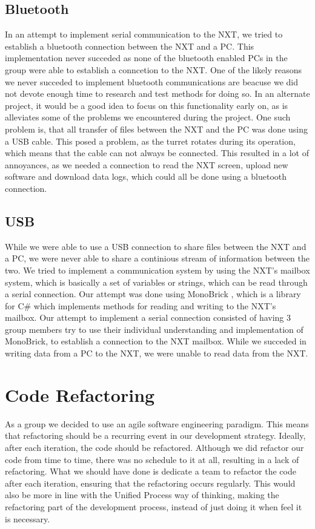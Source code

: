 \subsection{Bluetooth}
In an attempt to implement serial communication to the NXT, we tried to
establish a bluetooth connection between the NXT and a PC. This implementation
never succeded as none of the bluetooth enabled PCs in the group were able to
establish a conncetion to the NXT.\nl
One of the likely reasons we never succeded to implement bluetooth
communications are beacuse we did not devote enough time to research and test
methods for doing so. In an alternate project, it would be a good idea to focus
on this functionality early on, as is alleviates some of the problems we
encountered during the project. One such problem is, that all transfer of files
between the NXT and the PC was done using a USB cable. This posed a problem, as
the turret rotates during its operation, which means that the cable can not
always be connected. This resulted in a lot of annoyances, as we needed a
connection to read the NXT screen, upload new software and download data logs,
which could all be done using a bluetooth connection.

\subsection{USB}
While we were able to use a USB connection to share files between the NXT and a
PC, we were never able to share a continious stream of information between the
two. We tried to implement a communication system by using the NXT's mailbox
system, which is basically a set of variables or strings, which can be read
through a serial connection. Our attempt was done using MonoBrick
\cite{MonoBrick}, which is a library for C\# which implements methods for
reading and writing to the NXT's mailbox. Our attempt to implement a serial
connection consisted of having 3 group members try to use their individual
understanding and implementation of MonoBrick, to establish a connection to the
NXT mailbox. While we succeded in writing data from a PC to the NXT, we were
unable to read data from the NXT.

\section{Code Refactoring}
As a group we decided to use an agile software engineering paradigm. This means
that refactoring should be a recurring event in our development strategy.
Ideally, after each iteration, the code should be refactored. Although we did
refactor our code from time to time, there was no schedule to it at all,
resulting in a lack of refactoring. What we should have done is dedicate a team
to refactor the code after each iteration, ensuring that the refactoring occurs
regularly. This would also be more in line with the Unified Process way of
thinking, making the refactoring part of the development process, instead of
just doing it when feel it is necessary.

